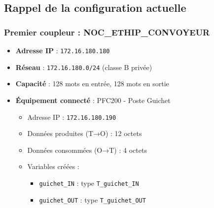 


\subsection{Rappel de la configuration actuelle}

\subsubsection{Premier coupleur : NOC\_ETHIP\_CONVOYEUR}

\begin{itemize}
    \item \textbf{Adresse IP} : \texttt{172.16.180.180}
    \item \textbf{Réseau} : \texttt{172.16.180.0/24} (classe B privée)
    \item \textbf{Capacité} : 128 mots en entrée, 128 mots en sortie
    \item \textbf{Équipement connecté} : PFC200 - Poste Guichet
    \begin{itemize}
        \item Adresse IP : \texttt{172.16.180.190}
        \item Données produites (T→O) : 12 octets 
        \item Données consommées (O→T) : 4 octets 
        \item Variables créées :
        \begin{itemize}
            \item \texttt{guichet\_IN} : type \texttt{T\_guichet\_IN}
            \item \texttt{guichet\_OUT} : type \texttt{T\_guichet\_OUT}
        \end{itemize}
    \end{itemize}
\end{itemize}



